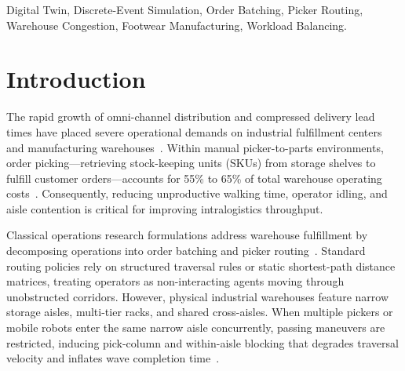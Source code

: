 \documentclass[conference]{IEEEtran}
\begin{document}
\begin{IEEEkeywords}
Digital Twin, Discrete-Event Simulation, Order Batching, Picker Routing, Warehouse Congestion, Footwear Manufacturing, Workload Balancing.
\end{IEEEkeywords}

\section{Introduction}
\label{sec:intro}
The rapid growth of omni-channel distribution and compressed delivery lead times have placed severe operational demands on industrial fulfillment centers and manufacturing warehouses~\cite{gialos2024state,maheshwari2023digital}. Within manual picker-to-parts environments, order picking---retrieving stock-keeping units (SKUs) from storage shelves to fulfill customer orders---accounts for 55\% to 65\% of total warehouse operating costs~\cite{roodbergen2001routing,gialos2024state}. Consequently, reducing unproductive walking time, operator idling, and aisle contention is critical for improving intralogistics throughput.

Classical operations research formulations address warehouse fulfillment by decomposing operations into order batching and picker routing~\cite{hall1993distance,roodbergen2001routing,briant2025solving}. Standard routing policies rely on structured traversal rules or static shortest-path distance matrices, treating operators as non-interacting agents moving through unobstructed corridors. However, physical industrial warehouses feature narrow storage aisles, multi-tier racks, and shared cross-aisles. When multiple pickers or mobile robots enter the same narrow aisle concurrently, passing maneuvers are restricted, inducing pick-column and within-aisle blocking that degrades traversal velocity and inflates wave completion time~\cite{franzke2017congestion,koreis2026side}.
\end{document}
